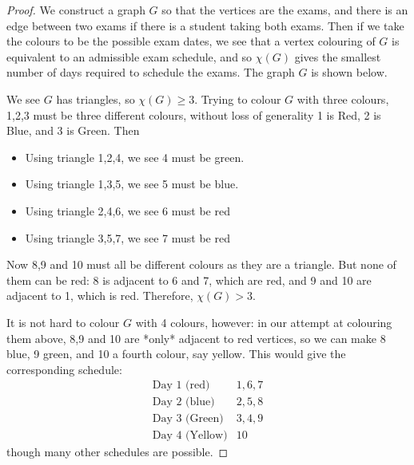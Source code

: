\documentclass{amsart}
\begin{document}
\begin{proof}
  We construct a graph $G$ so that the vertices are the exams, and there is an edge between two exams if there is a student taking both exams.  Then if we take the colours to be the possible exam dates, we see that a vertex colouring of $G$ is equivalent to an admissible exam schedule, and so $\chi(G)$ gives the smallest number of days required to schedule the exams.  The graph $G$ is shown below.
 

  

We see $G$ has triangles, so $\chi(G)\geq 3$.  Trying to colour $G$ with three colours, 1,2,3 must be three different colours, without loss of generality 1 is Red, 2 is Blue, and 3 is Green.  Then
\begin{itemize}
\item Using triangle 1,2,4, we see 4 must be green.
\item Using triangle 1,3,5, we see 5 must be blue.
\item Using triangle 2,4,6, we see 6 must be red
\item Using triangle 3,5,7, we see 7 must be red
\end{itemize}

Now 8,9 and 10 must all be different colours as they are a triangle.  But none of them can be red: 8 is adjacent to 6 and 7, which are red, and 9 and 10 are adjacent to 1, which is red.  Therefore, $\chi(G)>3$.

It is not hard to colour $G$ with 4 colours, however: in our attempt at colouring them above, 8,9 and 10 are *only* adjacent to red vertices, so we can make 8 blue, 9 green, and 10 a fourth colour, say yellow.  This would give the corresponding schedule:
$$\begin{array}{c|c}
  \text{Day 1 (red)} & 1, 6,7 \\
  \text{Day 2 (blue)} & 2,5,8 \\
  \text{Day 3 (Green)} & 3, 4, 9 \\
  \text{Day 4 (Yellow)} & 10
  \end{array}$$
though many other schedules are possible.



  \end{proof}
\end{document}

